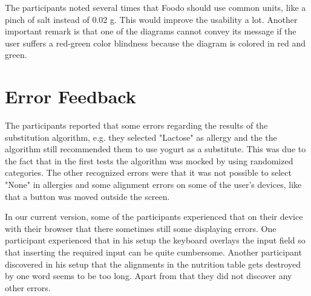 
The participants noted several times that Foodo should use common units, like a pinch of salt instead of 0.02 g. This would improve the usability a lot. Another important remark is that one of the diagrams cannot convey its message if the user suffers a red-green color blindness because the diagram is colored in red and green. 

\section{Error Feedback}


The participants reported that some errors regarding the results of the substitution algorithm, e.g. they selected "Lactose" as allergy and the the algorithm still recommended them to use yogurt as a substitute. This was due to the fact that in the first tests the algorithm was mocked by using randomized categories. The other recognized errors were that it was not possible to select "None" in allergies and some alignment errors on some of the user's devices, like that a button was moved outside the screen.


In our current version, some of the participants experienced that on their  device with their browser that there sometimes still some displaying errors. One participant experienced that in his setup the keyboard overlays the input field so that inserting the required input can be quite cumbersome. Another participant discovered in his setup that the alignments in the nutrition table gets destroyed by one word seems to be too long. Apart from that they did not discover any other errors.


